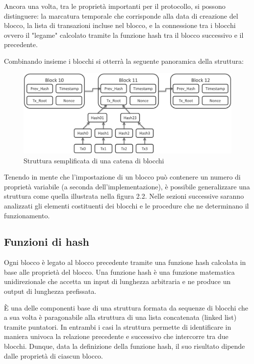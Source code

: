 Ancora una volta, tra le proprietà importanti per il protocollo, si possono distinguere: la marcatura temporale che corrisponde alla data di creazione del blocco, la lista di transazioni incluse nel blocco, e la connessione tra i blocchi ovvero il "legame" calcolato tramite la funzione hash tra il blocco successivo e il precedente.

Combinando insieme i blocchi si otterrà la seguente panoramica della struttura:

\begin{figure}[H]
\centering
\includegraphics[width=1\textwidth]{immagini/bitcoinblocks.png}
\caption{Struttura semplificata di una catena di blocchi}
\label{fig:ConcettoStrutturaBlocchi}

\end{figure}

Tenendo in mente che l'impostazione di un blocco può contenere un numero di proprietà variabile (a seconda dell'implementazione), è possibile generalizzare una struttura come quella illustrata nella figura 2.2. Nelle sezioni successive saranno analizzati gli elementi costituenti dei blocchi e le procedure che ne determinano il funzionamento.

\subsection{Funzioni di hash}

Ogni blocco è legato al blocco precedente tramite una funzione hash calcolata in base alle proprietà del blocco. Una funzione hash è una funzione matematica unidirezionale che accetta un input di lunghezza arbitraria e ne produce un output di lunghezza prefissata.

È una delle componenti base di una struttura formata da sequenze di blocchi che a sua volta è paragonabile alla struttura di una lista concatenata (linked list) tramite puntatori. In entrambi i casi la struttura permette di identificare in maniera univoca la relazione precedente e successivo che intercorre tra due blocchi. Dunque, data la definizione della funzione hash, il suo risultato dipende dalle proprietà di ciascun blocco.

